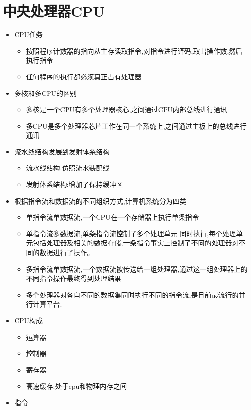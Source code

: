 \documentclass[a4paper,12pt,notitlepage]{article}
\begin{document}
\section{中央处理器CPU}
\begin{itemize}
	\item CPU任务
	\begin{itemize}
		\item 按照程序计数器的指向从主存读取指令,对指令进行译码,取出操作数,然后执行指令
		\item 任何程序的执行都必须真正占有处理器
	\end{itemize}
	\item 多核和多CPU的区别
	\begin{itemize}
		\item 多核是一个CPU有多个处理器核心,之间通过CPU内部总线进行通讯
		\item 多CPU是多个处理器芯片工作在同一个系统上,之间通过主板上的总线进行通讯
	\end{itemize}
	\item 流水线结构发展到发射体系结构
	\begin{itemize}
		\item 流水线结构:仿照流水装配线
		\item 发射体系结构:增加了保持缓冲区
	\end{itemize}
	\item 根据指令流和数据流的不同组织方式,计算机系统分为四类
	\begin{itemize}
		\item 单指令流单数据流,一个CPU在一个存储器上执行单条指令
		\item 单指令流多数据流,单条指令流控制了多个处理单元 同时执行,每个处理单元包括处理器及相关的数据存储,一条指令事实上控制了不同的处理器对不同的数据进行了操作。
		\item 多指令流单数据流,一个数据流被传送给一组处理器,通过这一组处理器上的不同指令操作最终得到处理结果
		\item 多个处理器对各自不同的数据集同时执行不同的指令流,是目前最流行的并行计算平台.
	\end{itemize}
	\item CPU构成
	\begin{itemize}
		\item 运算器
		\item 控制器
		\item 寄存器
		\item 高速缓存:处于cpu和物理内存之间
	\end{itemize}
	\item 指令
	\begin{itemize}

\end{itemize}
\end{itemize}
\end{document}
